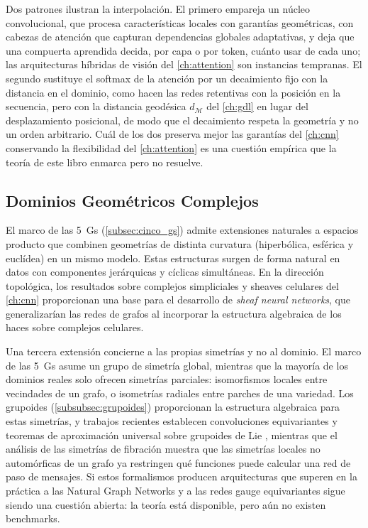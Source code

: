 Dos patrones ilustran la interpolación. El primero empareja un núcleo convolucional, que procesa características locales con garantías geométricas, con cabezas de atención que capturan dependencias globales adaptativas, y deja que una compuerta aprendida decida, por capa o por token, cuánto usar de cada uno; las arquitecturas híbridas de visión del \autoref{ch:attention} son instancias tempranas. El segundo sustituye el softmax de la atención por un decaimiento fijo con la distancia en el dominio, como hacen las redes retentivas con la posición en la secuencia, pero con la distancia geodésica $d_\mathcal{M}$ del \autoref{ch:gdl} en lugar del desplazamiento posicional, de modo que el decaimiento respeta la geometría y no un orden arbitrario. Cuál de los dos preserva mejor las garantías del \autoref{ch:cnn} conservando la flexibilidad del \autoref{ch:attention} es una cuestión empírica que la teoría de este libro enmarca pero no resuelve.

\subsection{Dominios Geométricos Complejos}

El marco de las 5~Gs (\autoref{subsec:cinco_gs}) admite extensiones naturales a espacios producto que combinen geometrías de distinta curvatura (hiperbólica, esférica y euclídea) en un mismo modelo. Estas estructuras surgen de forma natural en datos con componentes jerárquicas y cíclicas simultáneas. En la dirección topológica, los resultados sobre complejos simpliciales y sheaves celulares del \autoref{ch:cnn} proporcionan una base para el desarrollo de \textit{sheaf neural networks}, que generalizarían las redes de grafos al incorporar la estructura algebraica de los haces sobre complejos celulares.

Una tercera extensión concierne a las propias simetrías y no al dominio. El marco de las 5~Gs asume un grupo de simetría global, mientras que la mayoría de los dominios reales solo ofrecen simetrías parciales: isomorfismos locales entre vecindades de un grafo, o isometrías radiales entre parches de una variedad. Los grupoides (\autoref{subsubsec:grupoides}) proporcionan la estructura algebraica para estas simetrías, y trabajos recientes establecen convoluciones equivariantes y teoremas de aproximación universal sobre grupoides de Lie \citep{astwood2026liegroupoid, maruyama2025categorical}, mientras que el análisis de las simetrías de fibración \citep{velarde2026fibration} muestra que las simetrías locales no automórficas de un grafo ya restringen qué funciones puede calcular una red de paso de mensajes. Si estos formalismos producen arquitecturas que superen en la práctica a las Natural Graph Networks \citep{dehaan2020natural} y a las redes gauge equivariantes sigue siendo una cuestión abierta: la teoría está disponible, pero aún no existen benchmarks.

